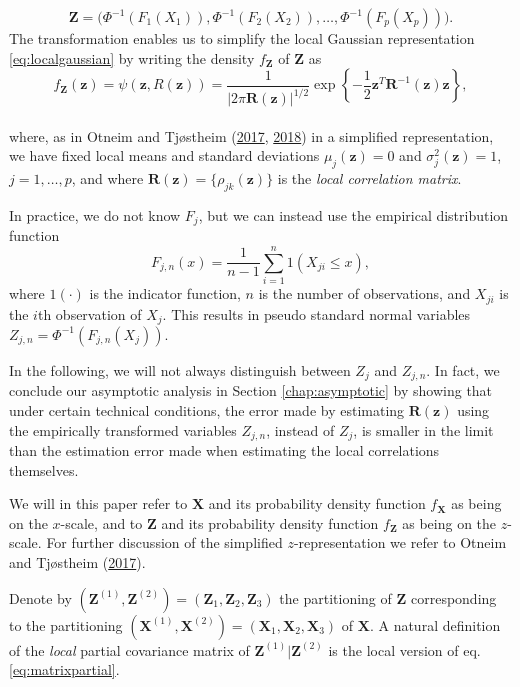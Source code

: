 \documentclass[
  12pt,
  letterpaper]{article}
\newcommand{\X}{\bm{X}}
\newcommand{\Xone}{\bm{X}^{(1)}}
\newcommand{\Xtwo}{\bm{X}^{(2)}}
\newcommand{\Z}{\bm{Z}}
\newcommand{\z}{\bm{z}}
\newcommand{\Zone}{\bm{Z}^{(1)}}
\newcommand{\Ztwo}{\bm{Z}^{(2)}}
\newcommand{\R}{\bm{R}}
\theoremstyle{definition}
\theoremstyle{definition}
\theoremstyle{definition}
\theoremstyle{remark}
\begin{document}
\begin{equation}
\Z = \Big(\Phi^{-1}\left(F_{1}(X_1)\right), \Phi^{-1}\left(F_{2}(X_2)\right), \ldots, \Phi^{-1}\left(F_{p}(X_p)\right)\Big).
\label{eq:trans}
\end{equation}
The transformation enables us to simplify the local Gaussian representation \eqref{eq:localgaussian} by writing the density \(f_{\Z}\) of \(\Z\) as
\begin{equation}
f_{\Z}(\z) = \psi(\z, R(\z)) = \frac{1}{|2\pi\R(\z)|^{1/2}}\exp\left\{-\frac{1}{2}\z^T\R^{-1}(\z)\z\right\},
\label{eq:lgdeapprox}
\end{equation}\\
where, as in Otneim and Tjøstheim (\protect\hyperlink{ref-otneim2017locally}{2017}, \protect\hyperlink{ref-otneim2017conditional}{2018}) in a simplified representation, we have fixed local means and standard deviations \(\mu_j(\z) = 0\) and \(\sigma_j^2(\z) = 1\), \(j = 1,\ldots,p\), and where \(\R(\z) = \{\rho_{jk}(\z)\}\) is the \emph{local correlation matrix}.

In practice, we do not know \(F_{j}\), but we can instead use the empirical distribution function
\[F_{j,n}(x) = \frac{1}{n-1}\sum_{i=1}^n 1\left(X_{ji} \leq x\right),\]
where \(1(\cdot)\) is the indicator function, \(n\) is the number of observations, and \(X_{ji}\) is the \(i\)th observation of \(X_j\). This results in pseudo standard normal variables \(Z_{j,n} = \Phi^{-1}(F_{j,n}(X_j))\).

In the following, we will not always distinguish between \(Z_j\) and \(Z_{j,n}\). In fact, we conclude our asymptotic analysis in Section \ref{chap:asymptotic} by showing that under certain technical conditions, the error made by estimating \(\R(\z)\) using the empirically transformed variables \(Z_{j,n}\), instead of \(Z_j\), is smaller in the limit than the estimation error made when estimating the local correlations themselves.

We will in this paper refer to \(\X\) and its probability density function \(f_{\X}\) as being on the \(x\)-scale, and to \(\Z\) and its probability density function \(f_{\Z}\) as being on the \(z\)-scale. For further discussion of the simplified \(z\)-representation we refer to Otneim and Tjøstheim (\protect\hyperlink{ref-otneim2017locally}{2017}).

Denote by \((\Zone, \Ztwo) = (\Z_1, \Z_2, \Z_3)\) the partitioning of \(\Z\) corresponding to the partitioning \((\Xone, \Xtwo) = (\X_1, \X_2, \X_3)\) of \(\X\). A natural definition of the \emph{local} partial covariance matrix of \(\Zone|\Ztwo\) is the local version of eq. \eqref{eq:matrixpartial}.
\end{document}

